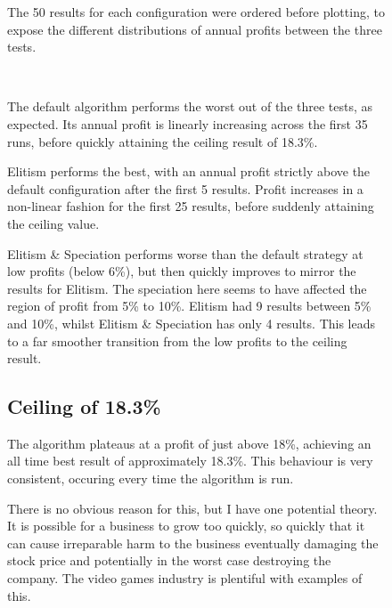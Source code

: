 \begin{figure}[h]
    \setlength{\parindent}{24pt}
    The 50 results for each configuration were ordered before plotting, to expose the different distributions of annual profits between the three tests. \newline

    {\centering
    \\}
    \vspace{3mm}
    
    The default algorithm performs the worst out of the three tests, as expected. Its annual profit is linearly increasing across the first 35 runs, before quickly attaining the ceiling result of 18.3\%. \newline
    
    Elitism performs the best, with an annual profit strictly above the default configuration after the first 5 results. Profit increases in a non-linear fashion for the first 25 results, before suddenly attaining the ceiling value. \newline
    
    Elitism \& Speciation performs worse than the default strategy at low profits (below 6\%), but then quickly improves to mirror the results for Elitism. The speciation here seems to have affected the region of profit from 5\% to 10\%. Elitism had 9 results between 5\% and 10\%, whilst Elitism \& Speciation has only 4 results. This leads to a far smoother transition from the low profits to the ceiling result.
    
    \subsection{Ceiling of 18.3\%}
    The algorithm plateaus at a profit of just above 18\%, achieving an all time best result of approximately 18.3\%. This behaviour is very consistent, occuring every time the algorithm is run. \newline
    
    There is no obvious reason for this, but I have one potential theory. It is possible for a business to grow too quickly, so quickly that it can cause irreparable harm to the business eventually damaging the stock price and potentially in the worst case destroying the company. The video games industry is plentiful with examples of this. \newline
     
\end{figure}


